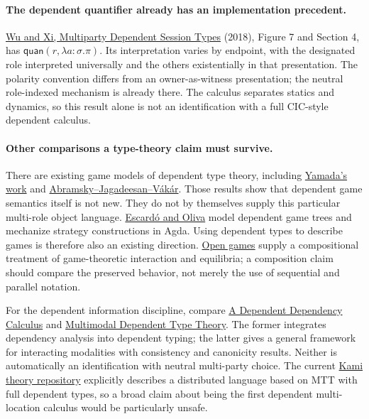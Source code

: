\documentclass[11pt]{article}
\begin{document}
\paragraph{The dependent quantifier already has an implementation precedent.}
\href{https://arxiv.org/pdf/1808.00077}{Wu and Xi, Multiparty Dependent Session
Types} (2018), Figure 7 and Section 4, has
$\mathsf{quan}(r,\lambda a:\sigma.\pi)$. Its interpretation varies by endpoint,
with the designated role interpreted universally and the others existentially
in that presentation. The polarity convention differs from an owner-as-witness
presentation; the neutral role-indexed mechanism is already there. The calculus
separates statics and dynamics, so this result alone is not an identification with
a full CIC-style dependent calculus.

\paragraph{Other comparisons a type-theory claim must survive.}
There are existing game models of dependent type theory, including
\href{https://arxiv.org/abs/1610.01669}{Yamada's work} and
\href{https://doi.org/10.1016/j.ic.2018.02.015}{Abramsky--Jagadeesan--V\'ak\'ar}.
Those results show that dependent game semantics itself is not new. They do not
by themselves supply this particular multi-role object language.
\href{https://arxiv.org/abs/2212.07735}{Escard\'o and Oliva} model dependent game
trees and mechanize strategy constructions in Agda. Using dependent types to
describe games is therefore also an existing direction.
\href{https://arxiv.org/abs/1603.04641}{Open games} supply a compositional treatment
of game-theoretic interaction and equilibria; a composition claim should compare
the preserved behavior, not merely the use of sequential and parallel notation.

For the dependent information discipline, compare
\href{https://arxiv.org/abs/2201.11040}{A Dependent Dependency Calculus} and
\href{https://arxiv.org/abs/2011.15021}{Multimodal Dependent Type Theory}. The former
integrates dependency analysis into dependent typing; the latter gives a general
framework for interacting modalities with consistency and canonicity results.
Neither is automatically an identification with neutral multi-party choice.
The current \href{https://github.com/kami-language/kami-theory}{Kami theory
repository} explicitly describes a distributed language based on MTT with full
dependent types, so a broad claim about being the first dependent multi-location
calculus would be particularly unsafe.
\end{document}
